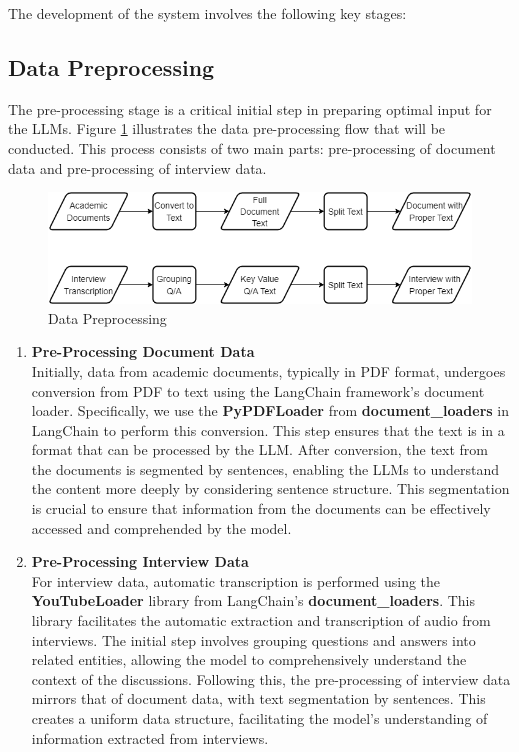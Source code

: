 \documentclass[runningheads]{llncs}
\begin{document}
The development of the system involves the following key stages:
\subsection{Data Preprocessing}
The pre-processing stage is a critical initial step in preparing optimal input for the LLMs. Figure \ref{fig:preprocessing} illustrates the data pre-processing flow that will be conducted. This process consists of two main parts: pre-processing of document data and pre-processing of interview data.

\begin{figure}[htbp]
        \centerline{\includegraphics[scale=0.4]{eng-preproc.png}}
        \caption{Data Preprocessing}
        \label{fig:preprocessing}
    \end{figure}
    
\begin{enumerate}
    \item \textbf{Pre-Processing Document Data} \\
    Initially, data from academic documents, typically in PDF format, undergoes conversion from PDF to text using the LangChain framework's document loader. Specifically, we use the \textbf{PyPDFLoader} from \textbf{document\_loaders} in LangChain to perform this conversion. This step ensures that the text is in a format that can be processed by the LLM. After conversion, the text from the documents is segmented by sentences, enabling the LLMs to understand the content more deeply by considering sentence structure. This segmentation is crucial to ensure that information from the documents can be effectively accessed and comprehended by the model.
    
    \item \textbf{Pre-Processing Interview Data} \\
    For interview data, automatic transcription is performed using the \textbf{YouTubeLoader} library from LangChain's  \textbf{document\_loaders}. This library facilitates the automatic extraction and transcription of audio from interviews. The initial step involves grouping questions and answers into related entities, allowing the model to comprehensively understand the context of the discussions. Following this, the pre-processing of interview data mirrors that of document data, with text segmentation by sentences. This creates a uniform data structure, facilitating the model's understanding of information extracted from interviews.
\end{enumerate}
\end{document}
